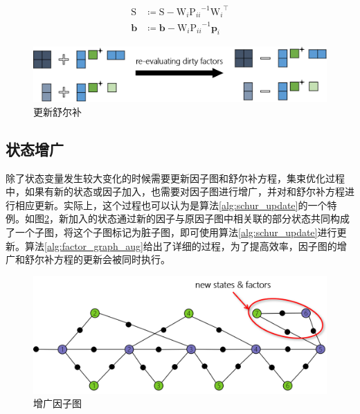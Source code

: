 \begin{algorithm}
\begin{algorithmic}
        \[\begin{aligned}
                \mathrm{S} &\coloneqq \mathrm{S} - \mathrm{W}_i{\mathrm{P}_{ii}}^{-1}{\mathrm{W}_i}^\top \\
                \bm{b}     &\coloneqq \bm{b}     - \mathrm{W}_i{\mathrm{P}_{ii}}^{-1}\bm{p}_i
        \end{aligned}\]
    \EndFor

\end{algorithmic}
\label{alg:schur_update}
\end{algorithm}

\begin{figure}[htb!]
    \centering
    \includegraphics[width=\textwidth]{figs/schur_update.png}
    \caption{更新舒尔补}
    \label{fig:schur_update}
\end{figure}

\subsection{状态增广}

除了状态变量发生较大变化的时候需要更新因子图和舒尔补方程，集束优化过程中，如果有新的状态或因子加入，也需要对因子图进行增广，并对和舒尔补方程进行相应更新。实际上，这个过程也可以认为是算法\ref{alg:schur_update}的一个特例。如图\ref{fig:factor_graph_aug}，新加入的状态通过新的因子与原因子图中相关联的部分状态共同构成了一个子图，将这个子图标记为脏子图，即可使用算法\ref{alg:schur_update}进行更新。算法\ref{alg:factor_graph_aug}给出了详细的过程，为了提高效率，因子图的增广和舒尔补方程的更新会被同时执行。

\begin{figure}[htb!]
    \centering
    \includegraphics[width=.8\textwidth]{figs/factor_graph_aug.png}
    \caption{增广因子图}
    \label{fig:factor_graph_aug}
\end{figure}


